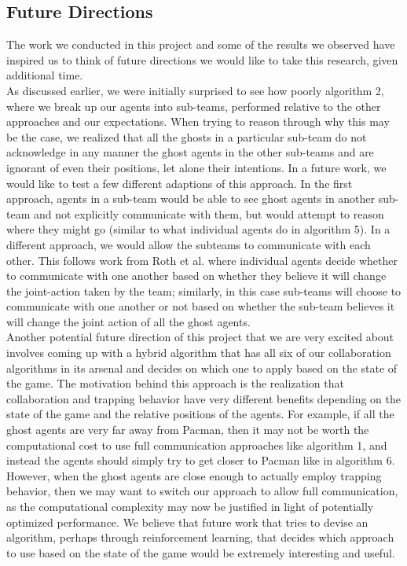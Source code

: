 \documentclass[11pt]{article}
\begin{document}
\begin{multicols}{2}
\section{Future Directions}
The work we conducted in this project and some of the results we observed have inspired us to think of future directions we would like to take this research, given additional time.\\
As discussed earlier, we were initially surprised to see how poorly algorithm 2, where we break up our agents into sub-teams, performed relative to the other approaches and our expectations. When trying to reason through why this may be the case, we realized that all the ghosts in a particular sub-team do not acknowledge in any manner the ghost agents in the other sub-teams and are ignorant of even their positions, let alone their intentions. In a future work, we would like to test a few different adaptions of this approach. In the first approach, agents in a sub-team would be able to see ghost agents in another sub-team and not explicitly communicate with them, but would attempt to reason where they might go (similar to what individual agents do in algorithm 5). In a different approach, we would allow the subteams to communicate with each other. This follows work from Roth et al. where individual agents decide whether to communicate with one another based on whether they believe it will change the joint-action taken by the team; similarly, in this case sub-teams will choose to communicate with one another or not based on whether the sub-team believes it will change the joint action of all the ghost agents.\\ 
Another potential future direction of this project that we are very excited about involves coming up with a hybrid algorithm that has all six of our collaboration algorithms in its arsenal and decides on which one to apply based on the state of the game. The motivation behind this approach is the realization that collaboration and trapping behavior have very different benefits depending on the state of the game and the relative positions of the agents. For example, if all the ghost agents are very far away from Pacman, then it may not be worth the computational cost to use full communication approaches like algorithm 1, and instead the agents should simply try to get closer to Pacman like in algorithm 6. However, when the ghost agents are close enough to actually employ trapping behavior, then we may want to switch our approach to allow full communication, as the computational complexity may now be justified in light of potentially optimized performance. We believe that future work that tries to devise an algorithm, perhaps through reinforcement learning, that decides which approach to use based on the state of the game would be extremely interesting and useful.


\end{multicols}
\end{document}
